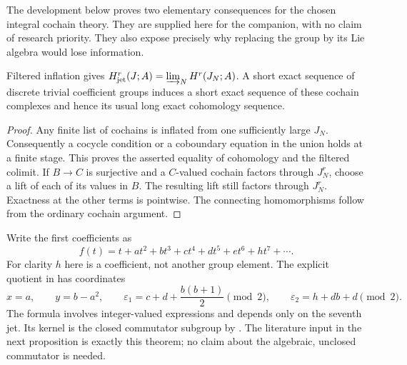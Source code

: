 The development below proves two elementary consequences for the chosen
integral cochain theory. They are supplied here for the companion, with no
claim of research priority. They also expose precisely why replacing the
group by its Lie algebra would lose information.

\begin{lemma}\ours
Filtered inflation gives
\(H^r_{\mathrm{jet}}(J;A)=\varinjlim_N H^r(J_N;A)\).
A short exact sequence of discrete trivial coefficient groups induces a
short exact sequence of these cochain complexes and hence its usual long
exact cohomology sequence.
\end{lemma}
\begin{proof}
Any finite list of cochains is inflated from one sufficiently large \(J_N\).
Consequently a cocycle condition or a coboundary equation in the union holds
at a finite stage. This proves the asserted equality of cohomology and the
filtered colimit. If \(B\to C\) is surjective and a \(C\)-valued cochain
factors through \(J_N^r\), choose a lift of each of its values in \(B\).
The resulting lift still factors through \(J_N^r\). Exactness at the other
terms is pointwise. The connecting homomorphisms follow from the ordinary
cochain argument.
\end{proof}

Write the first coefficients as
\[
 f(t)=t+at^2+bt^3+ct^4+dt^5+et^6+ht^7+\cdots.
\]
For clarity \(h\) here is a coefficient, not another group element. The
explicit quotient in \citet[Proposition~2.1]{babenkobogatyi2008substitutions}
has coordinates
\[
 x=a,\qquad y=b-a^2,\qquad
 \varepsilon_1=c+d+\frac{b(b+1)}2\pmod2,\qquad
 \varepsilon_2=h+db+d\pmod2.                 \tag{J1}
\]
The formula involves integer-valued expressions and depends only on the
seventh jet. Its kernel is the closed commutator subgroup by
\citet[Proposition~2.9, pp.~249--250]{babenkobogatyi2008substitutions}.
The literature input in the next proposition is
exactly this theorem; no claim about the algebraic, unclosed commutator is
needed.

